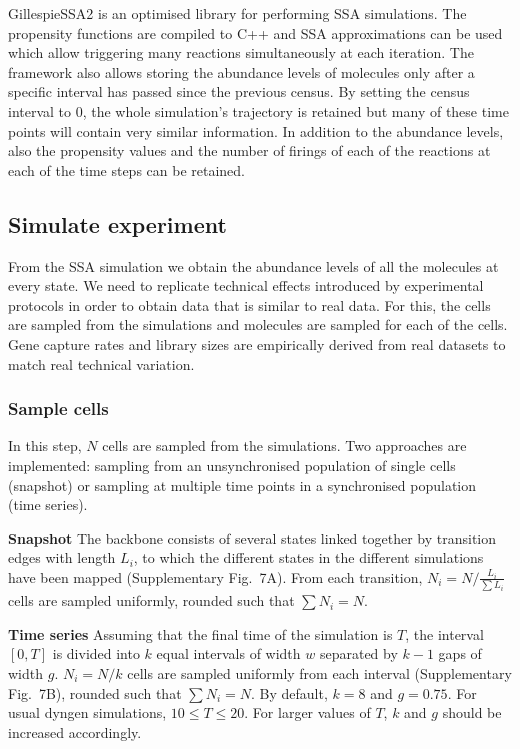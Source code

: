 \documentclass[10pt, a4paper]{article}
\begin{document}
GillespieSSA2 is an optimised library for performing SSA simulations.
The propensity functions are compiled to C++ and SSA approximations can
be used which allow triggering many reactions simultaneously at each
iteration. The framework also allows storing the abundance levels of
molecules only after a specific interval has passed since the previous
census. By setting the census interval to 0, the whole simulation's
trajectory is retained but many of these time points will contain very
similar information. In addition to the abundance levels, also the
propensity values and the number of firings of each of the reactions at
each of the time steps can be retained.

\hypertarget{sec:dyngen-experiment}{%
	\subsection{Simulate experiment}\label{sec:dyngen-experiment}}

From the SSA simulation we obtain the abundance levels of all the
molecules at every state. We need to replicate technical effects
introduced by experimental protocols in order to obtain data that is
similar to real data. For this, the cells are sampled from the
simulations and molecules are sampled for each of the cells. Gene
capture rates and library sizes are empirically derived from real
datasets to match real technical variation.

\hypertarget{sample-cells}{%
	\subsubsection{Sample cells}\label{sample-cells}}

In this step, \(N\) cells are sampled from the simulations. Two
approaches are implemented: sampling from an unsynchronised population
of single cells (snapshot) or sampling at multiple time points in a
synchronised population (time series).

\textbf{Snapshot} The backbone consists of several states linked
together by transition edges with length \(L_i\), to which the different
states in the different simulations have been mapped (Supplementary
Fig.~7A). From each transition, \(N_i = N / \frac{L_i}{\sum L_i}\) cells
are sampled uniformly, rounded such that \(\sum N_i = N\).

\textbf{Time series} Assuming that the final time of the simulation is
\(T\), the interval \([0, T]\) is divided into \(k\) equal intervals of
width \(w\) separated by \(k-1\) gaps of width \(g\). \(N_i = N / k\)
cells are sampled uniformly from each interval (Supplementary Fig.~7B),
rounded such that \(\sum N_i = N\). By default, \(k = 8\) and
\(g = 0.75\). For usual dyngen simulations, \(10 \leq T \leq 20\). For
larger values of \(T\), \(k\) and \(g\) should be increased accordingly.
\end{document}
